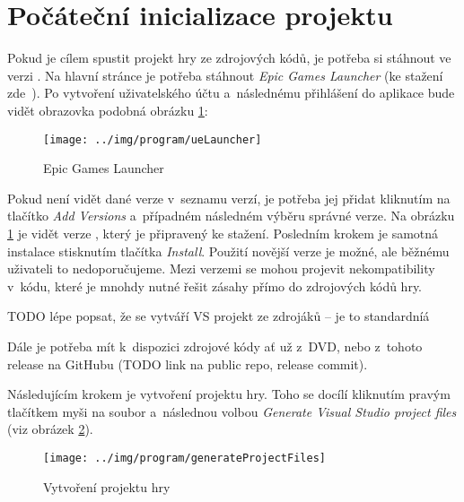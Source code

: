 
\section{Počáteční inicializace projektu}

Pokud je cílem spustit projekt hry ze zdrojových kódů, je potřeba si stáhnout \UE{} ve verzi . Na hlavní stránce \UE{} je potřeba stáhnout \textit{Epic Games Launcher} (ke stažení zde~\citep{ue_download}). Po vytvoření uživatelského účtu a~následnému přihlášení do aplikace bude vidět obrazovka podobná obrázku \ref{fig:ueLauncher}:


\begin{figure}[!ht]\centering
\texttt{[image: ../img/program/ueLauncher]}

\caption{Epic Games Launcher}
\label{fig:ueLauncher}

\end{figure}

\FloatBarrier

Pokud není vidět \UE{} dané verze v~seznamu verzí, je potřeba jej přidat kliknutím na tlačítko \textit{Add Versions} a~případném následném výběru správné verze. Na obrázku \ref{fig:ueLauncher} je vidět \UE{} verze , který je připravený ke stažení. Posledním krokem je samotná instalace stisknutím tlačítka \textit{Install}. Použití novější verze \UEu{} je možné, ale běžnému uživateli to nedoporučujeme. Mezi verzemi se mohou projevit nekompatibility v~kódu, které je mnohdy nutné řešit zásahy přímo do zdrojových kódů hry.

TODO lépe popsat, že se vytváří VS projekt ze zdrojáků -- je to standardníá

Dále je potřeba mít k~dispozici zdrojové kódy ať už z~DVD, nebo z~tohoto release na GitHubu (TODO link na public repo, release commit).
 
Následujícím krokem je vytvoření projektu hry. Toho se docílí kliknutím pravým tlačítkem myši na soubor  a~následnou volbou \textit{Generate Visual Studio project files} (viz obrázek \ref{fig:generateProjectFiles}). 

\begin{figure}[!ht]\centering
\texttt{[image: ../img/program/generateProjectFiles]}

\caption{Vytvoření projektu hry}
\label{fig:generateProjectFiles}

\end{figure}

